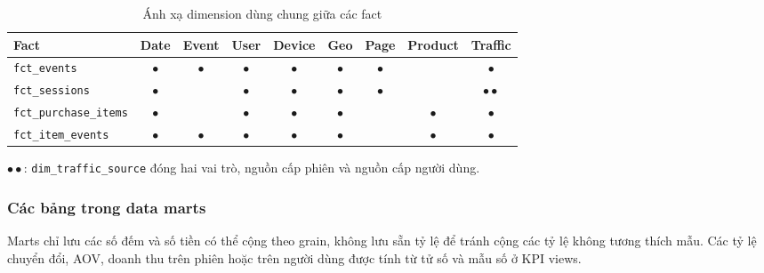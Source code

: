 \begin{table}[H]
\centering
\caption{Ánh xạ dimension dùng chung giữa các fact}
\label{tab:bus-matrix}
\footnotesize
\renewcommand{\arraystretch}{1.25}
\begin{tabular}{|l|c|c|c|c|c|c|c|c|}
\hline
\textbf{Fact} & \textbf{Date} & \textbf{Event} & \textbf{User} & \textbf{Device} & \textbf{Geo} & \textbf{Page} & \textbf{Product} & \textbf{Traffic} \\
\hline
\texttt{fct\_events} & $\bullet$ & $\bullet$ & $\bullet$ & $\bullet$ & $\bullet$ & $\bullet$ & & $\bullet$ \\
\texttt{fct\_sessions} & $\bullet$ & & $\bullet$ & $\bullet$ & $\bullet$ & $\bullet$ & & $\bullet\bullet$ \\
\texttt{fct\_purchase\_items} & $\bullet$ & & $\bullet$ & $\bullet$ & $\bullet$ & & $\bullet$ & $\bullet$ \\
\texttt{fct\_item\_events} & $\bullet$ & $\bullet$ & $\bullet$ & $\bullet$ & $\bullet$ & & $\bullet$ & $\bullet$ \\
\hline
\end{tabular}

\vspace{0.1cm}
\scriptsize{$\bullet\bullet$: \texttt{dim\_traffic\_source} đóng hai vai trò, nguồn cấp phiên và nguồn cấp người dùng.}
\end{table}

\subsubsection{Các bảng trong data marts}

Marts chỉ lưu các số đếm và số tiền có thể cộng theo grain, không lưu sẵn tỷ lệ để tránh cộng các tỷ lệ không tương thích mẫu. Các tỷ lệ chuyển đổi, AOV, doanh thu trên phiên hoặc trên người dùng được tính từ tử số và mẫu số ở KPI views.

